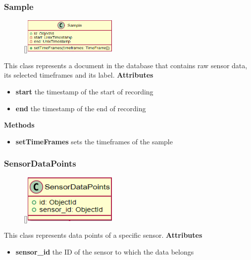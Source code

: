 \subsubsection{Sample}
\label{Sample}
\begin{figure}
    \raisebox{0pt}[\dimexpr{}\baselineskip\relax]{\includegraphics[width=4.5cm]{classes/workspace-management/7.png}}
\end{figure} 
\par
This class represents a document in the database that contains raw sensor data, its selected timeframes and its label.
\newline
\newline
\textbf{Attributes}
\begin{itemize}
    \item \textbf{start} the timestamp of the start of recording
    \item \textbf{end} the timestamp of the end of recording
\end{itemize}
\textbf{Methods}
\begin{itemize}
    \item \textbf{setTimeFrames} sets the timeframes of the sample
\end{itemize}

\subsubsection{SensorDataPoints}
\label{SensorDataPoints}
\begin{figure}
    \raisebox{0pt}[\dimexpr{}\baselineskip\relax]{\includegraphics[width=4.5cm]{classes/workspace-management/8.png}}
\end{figure} 
\par
This class represents data points of a specific sensor.
\newline
\newline
\textbf{Attributes}
\begin{itemize}
    \item \textbf{sensor\_id} the ID of the sensor to which the data belongs
\end{itemize}

